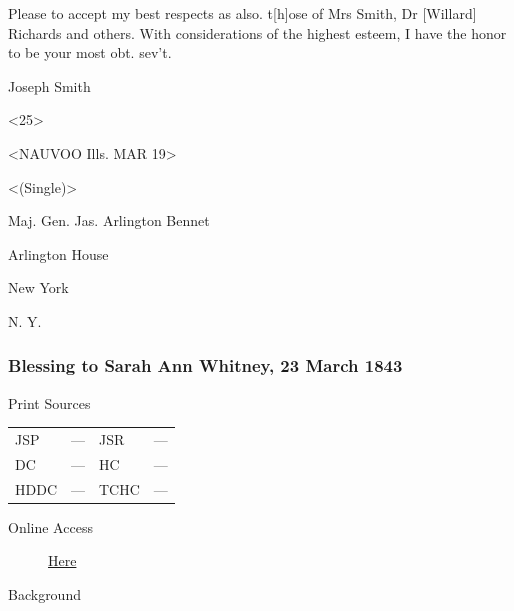				\begin{tightright}
					Please to accept my best respects as also. t[h]ose of Mrs Smith, Dr [Willard] Richards and others. With considerations of the highest esteem, I have the honor to be your most obt. sev't.

					Joseph Smith

					<25>
				\end{tightright}

				<NAUVOO Ills. MAR 19>

				<(Single)>

				Maj. Gen. Jas. Arlington Bennet

				Arlington House

				New York

				N. Y.
				
		\subsubsection{Blessing to Sarah Ann Whitney, 23 March 1843}
			\label{EMS-1843-JS-23-MAR-1843-SAW}
			
			\begin{description}
				\item[Print Sources]
			\end{description}

				\begin{tabular}{p{0.5in}p{1in}p{0.5in}p{1in}}
				JSP	 	& ---		& JSR 		& --- \\
				DC	 	& ---		& HC 		& --- \\
				HDDC 	& ---		& TCHC 		& --- \\
				\end{tabular}
			
			\begin{description}
				\item[Online Access] \href{https://www.josephsmithpapers.org/paper-summary/blessing-to-sarah-ann-whitney-23-march-1843/1}{Here}
			\end{description}
			
			\begin{description}
				\item[Background]
			\end{description}
			
			
